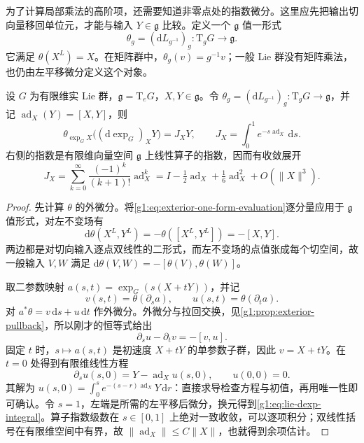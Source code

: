为了计算局部乘法的高阶项，还需要知道非零点处的指数微分。这里应先把输出切向量移回单位元，才能与输入 \(Y\in\mathfrak g\) 比较。定义一个 \(\mathfrak g\) 值一形式
\[
	\theta_g=(\mathrm{d}L_{g^{-1}})_g:\mathrm{T}_gG\longrightarrow\mathfrak g.
\]
它满足 \(\theta(X^L)=X\)。在矩阵群中，\(\theta_g(v)=g^{-1}v\)；一般 Lie 群没有矩阵乘法，也仍由左平移微分定义这个对象。

\begin{proposition}\label{g1:prop:lie-exponential-differential}
	设 \(G\) 为有限维实 Lie 群，\(\mathfrak g=\mathrm{T}_eG\)，\(X,Y\in\mathfrak g\)。令 \(\theta_g=(\mathrm{d}L_{g^{-1}})_g:\mathrm{T}_gG\to\mathfrak g\)，并记 \(\operatorname{ad}_X(Y)=[X,Y]\)，则
	\begin{equation}\label{g1:eq:lie-dexp-integral}
		\theta_{\exp_GX}\bigl((\mathrm{d}\exp_G)_XY\bigr)
		=J_XY,\qquad
		J_X=\int_0^1 e^{-s\operatorname{ad}_X}\,\mathrm{d}s.
	\end{equation}
	右侧的指数是有限维向量空间 \(\mathfrak g\) 上线性算子的指数，因而有收敛展开
	\begin{equation}\label{g1:eq:lie-dexp-series}
		J_X=\sum_{k=0}^{\infty}\frac{(-1)^k}{(k+1)!}\operatorname{ad}_X^k
		=I-\tfrac12\operatorname{ad}_X+\tfrac16\operatorname{ad}_X^2+O(\|X\|^3).
	\end{equation}
\end{proposition}
\begin{proof}
	先计算 \(\theta\) 的外微分。将\eqref{g1:eq:exterior-one-form-evaluation}逐分量应用于 \(\mathfrak g\) 值形式，对左不变场有
	\[
		\mathrm{d}\theta(X^L,Y^L)=-\theta([X^L,Y^L])=-[X,Y].
	\]
	两边都是对切向输入逐点双线性的二形式，而左不变场的点值张成每个切空间，故一般输入 \(V,W\) 满足 \(\mathrm{d}\theta(V,W)=-[\theta(V),\theta(W)]\)。

	取二参数映射 \(a(s,t)=\exp_G(s(X+tY))\)，并记
	\[
		v(s,t)=\theta(\partial_sa),\qquad u(s,t)=\theta(\partial_ta).
	\]
	对 \(a^*\theta=v\,\mathrm{d}s+u\,\mathrm{d}t\) 作外微分。外微分与拉回交换，见\cref{g1:prop:exterior-pullback}，所以刚才的恒等式给出
	\[
		\partial_su-\partial_tv=-[v,u].
	\]
	固定 \(t\) 时，\(s\mapsto a(s,t)\) 是初速度 \(X+tY\) 的单参数子群，因此 \(v=X+tY\)。在 \(t=0\) 处得到有限维线性方程
	\[
		\partial_su(s,0)=Y-\operatorname{ad}_Xu(s,0),\qquad u(0,0)=0.
	\]
	其解为 \(u(s,0)=\int_0^s e^{-(s-r)\operatorname{ad}_X}Y\,\mathrm{d}r\)：直接求导检查方程与初值，再用唯一性即可确认。令 \(s=1\)，左端是所需的左平移后微分，换元得到\eqref{g1:eq:lie-dexp-integral}。算子指数级数在 \(s\in[0,1]\) 上绝对一致收敛，可以逐项积分；双线性括号在有限维空间中有界，故 \(\|\operatorname{ad}_X\|\le C\|X\|\)，也就得到余项估计。
\end{proof}

